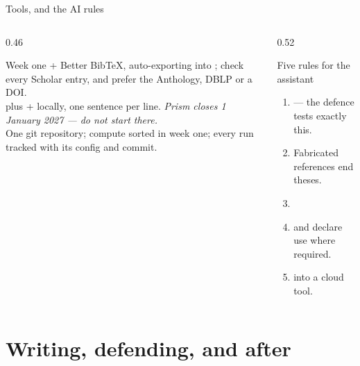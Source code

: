 \documentclass[aspectratio=169,11pt]{beamer}
\begin{document}
\begin{frame}{Tools, and the AI rules}
\begin{columns}[T]
\begin{column}{0.46\textwidth}
\begin{block}{Week one}
\footnotesize
{} + Better BibTeX, auto-exporting into ; check every
Scholar entry, and prefer the Anthology, DBLP or a DOI.\\[3pt]
 plus  +  locally, one sentence per
line. \emph{Prism closes 1 January 2027 --- do not start there.}\\[3pt]
One git repository; compute sorted in week one; every run tracked with its
config and commit.
\end{block}
\end{column}
\begin{column}{0.52\textwidth}
\begin{alertblock}{Five rules for the assistant}
\footnotesize
\begin{enumerate}
  \item {} --- the defence tests exactly
        this.
  \item {} Fabricated references
        end theses.
  \item {}
  \item {} and declare use where required.
  \item {} into a cloud tool.
\end{enumerate}
\end{alertblock}
\end{column}
\end{columns}
\end{frame}

\section{Writing, defending, and after}
\end{document}
